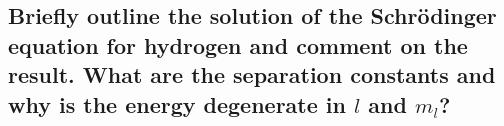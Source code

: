 \subsection{Briefly outline the solution of the Schrödinger equation for hydrogen and comment on the result. What are the separation constants and why is the energy degenerate in $l$ and $m_l$?}


